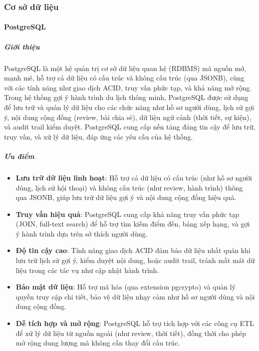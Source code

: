 
\subsubsection{Cơ sở dữ liệu}

\paragraph{PostgreSQL}

\subparagraph{Giới thiệu}
PostgreSQL là một hệ quản trị cơ sở dữ liệu quan hệ (RDBMS) mã nguồn mở, mạnh mẽ, hỗ trợ cả dữ liệu có cấu trúc và không cấu trúc (qua JSONB), cùng với các tính năng như giao dịch ACID, truy vấn phức tạp, và khả năng mở rộng. Trong hệ thống gợi ý hành trình du lịch thông minh, PostgreSQL được sử dụng để lưu trữ và quản lý dữ liệu cho các chức năng như hồ sơ người dùng, lịch sử gợi ý, nội dung cộng đồng (review, bài chia sẻ), dữ liệu ngữ cảnh (thời tiết, sự kiện), và audit trail kiểm duyệt. PostgreSQL cung cấp nền tảng đáng tin cậy để lưu trữ, truy vấn, và xử lý dữ liệu, đáp ứng các yêu cầu của hệ thống.

\subparagraph{Ưu điểm}
\begin{itemize}
    \item \textbf{Lưu trữ dữ liệu linh hoạt}: Hỗ trợ cả dữ liệu có cấu trúc (như hồ sơ người dùng, lịch sử hội thoại) và không cấu trúc (như review, hành trình) thông qua JSONB, giúp lưu trữ dữ liệu gợi ý và nội dung cộng đồng hiệu quả.
    \item \textbf{Truy vấn hiệu quả}: PostgreSQL cung cấp khả năng truy vấn phức tạp (JOIN, full-text search) để hỗ trợ tìm kiếm điểm đến, bảng xếp hạng, và gợi ý hành trình dựa trên sở thích người dùng.
    \item \textbf{Độ tin cậy cao}: Tính năng giao dịch ACID đảm bảo dữ liệu nhất quán khi lưu trữ lịch sử gợi ý, kiểm duyệt nội dung, hoặc audit trail, tránh mất mát dữ liệu trong các tác vụ như cập nhật hành trình.
    \item \textbf{Bảo mật dữ liệu}: Hỗ trợ mã hóa (qua extension pgcrypto) và quản lý quyền truy cập chi tiết, bảo vệ dữ liệu nhạy cảm như hồ sơ người dùng và nội dung cộng đồng.
    \item \textbf{Dễ tích hợp và mở rộng}: PostgreSQL hỗ trợ tích hợp với các công cụ ETL để xử lý dữ liệu từ nguồn ngoài (như review, thời tiết), đồng thời cho phép mở rộng dung lượng mà không cần thay đổi cấu trúc.
\end{itemize}

